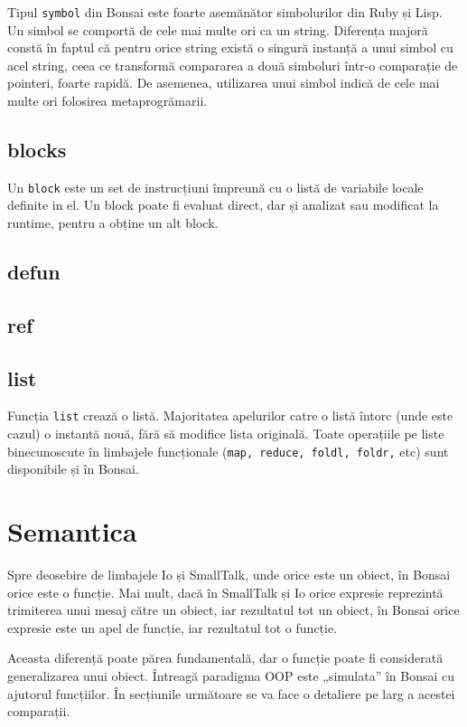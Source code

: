 \documentclass[12pt,a4paper]{memoir}
\begin{document}
Tipul \texttt{symbol} din Bonsai este foarte asemănător simbolurilor din Ruby\cite{ruby_symbols} și Lisp\cite{clhs_symbols}. Un simbol se comportă de cele mai multe ori ca un string. Diferența majoră constă în faptul că pentru orice string există o singură instanță a unui simbol cu acel string, ceea ce transformă compararea a două simboluri         într-o comparație de pointeri, foarte rapidă. De asemenea, utilizarea unui simbol indică de cele mai multe ori folosirea metaprogrămarii. 

\section{blocks}

Un \texttt{block} este un set de instrucțiuni împreună cu o listă de variabile locale definite in el. Un block poate fi evaluat direct, dar și analizat sau modificat la runtime, pentru a obține un alt block.

\section{defun}

\section{ref}

\section{list}

Funcția \texttt{list} crează o listă. Majoritatea apelurilor catre o listă întorc (unde este cazul) o instantă nouă, fără să modifice lista originală. Toate operațiile pe liste binecunoscute în limbajele funcționale (\texttt{map, reduce, foldl, foldr,} etc) sunt disponibile și în Bonsai.

\chapter{Semantica}

Spre deosebire de limbajele Io\cite{io} și SmallTalk\cite{smalltalk}, unde orice este un obiect, în Bonsai orice este o funcție. Mai mult, dacă în SmallTalk și Io orice expresie reprezintă trimiterea unui mesaj către un obiect, iar rezultatul tot un obiect, în Bonsai orice expresie este un apel de funcție, iar rezultatul tot o funcție. 

Aceasta diferență poate părea fundamentală, dar o funcție poate fi considerată generalizarea unui obiect. Întreagă paradigma OOP este „simulata” în Bonsai cu ajutorul funcțiilor. În secțiunile următoare se va face o detaliere pe larg a acestei comparații. 
\end{document}
